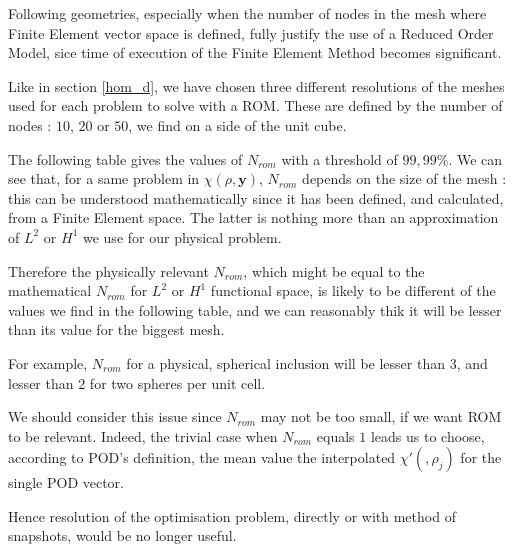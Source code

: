 
Following geometries, especially when the number of nodes in the mesh where Finite Element vector space is defined, fully justify the use of a Reduced Order Model, %
sice time of execution of the Finite Element Method becomes significant.

\par
Like in section \ref{hom_d}, we have chosen three different resolutions of the meshes used for each problem to solve with a ROM. %
These are defined by the number of nodes : $10$, $20$ or $50$, we find on a side of the unit cube.

\par
The following table gives the values of $N_{rom}$ with a threshold of $99,99\%$. We can see that, for a same problem in $\chi (\rho ,\mathbf{y})$, %
$N_{rom}$ depends on the size of the mesh : %
this can be understood mathematically since it has been defined, and calculated, from a Finite Element space. %
The latter is nothing more than an approximation of $L^2$ or $H^1$ we use for our physical problem.

\par
Therefore the physically relevant $N_{rom}$, which might be equal to the mathematical $N_{rom}$ for $L^2$ or $H^1$ functional space, %
is likely to be different of the values we find in the following table, %
and we can reasonably thik it will be lesser than its value for the biggest mesh.

\par
For example, $N_{rom}$ for a physical, spherical inclusion will be lesser than $3$, and lesser than $2$ for two spheres per unit cell.

\par
We should consider this issue since $N_{rom}$ may not be too small, if we want ROM to be relevant. %
Indeed, the trivial case when $N_{rom}$ equals $1$ leads us to choose, according to POD's definition, %
the mean value the interpolated $\chi '(,\rho_j)$ for the single POD vector.

\par
Hence resolution of the optimisation problem, directly or with method of snapshots, would be no longer useful.


